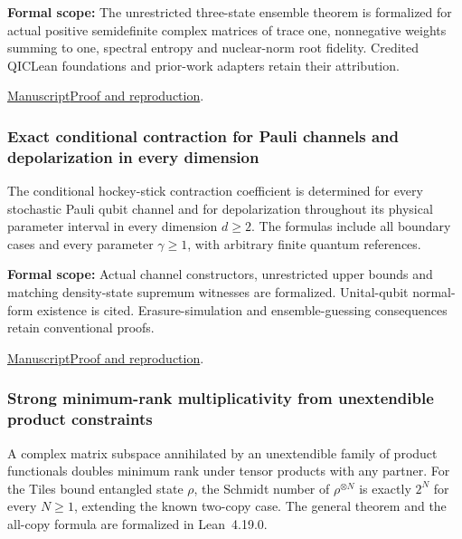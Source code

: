 \documentclass[11pt,a4paper]{article}
\begin{document}
\noindent\textbf{Formal scope:} The unrestricted three-state ensemble theorem is formalized for actual positive semidefinite complex matrices of trace one, nonnegative weights summing to one, spectral entropy and nuclear-norm root fidelity. Credited QICLean foundations and prior-work adapters retain their attribution.

\href{https://github.com/dvgyl/math-and-theory/blob/main/papers/physics/fidelity-three-state/manuscript.pdf}{Manuscript}\quad\href{https://github.com/dvgyl/math-and-theory/blob/main/papers/physics/fidelity-three-state/README.md}{Proof and reproduction}.

\subsubsection{Exact conditional contraction for Pauli channels and depolarization in every dimension}

The conditional hockey-stick contraction coefficient is determined for every stochastic Pauli qubit channel and for depolarization throughout its physical parameter interval in every dimension $d\ge2$. The formulas include all boundary cases and every parameter $\gamma\ge1$, with arbitrary finite quantum references.

\noindent\textbf{Formal scope:} Actual channel constructors, unrestricted upper bounds and matching density-state supremum witnesses are formalized. Unital-qubit normal-form existence is cited. Erasure-simulation and ensemble-guessing consequences retain conventional proofs.

\href{https://github.com/dvgyl/math-and-theory/blob/main/papers/physics/quantum-exact-contraction/quantum_exact_contraction.pdf}{Manuscript}\quad\href{https://github.com/dvgyl/math-and-theory/blob/main/papers/physics/quantum-exact-contraction/README.md}{Proof and reproduction}.

\subsubsection{Strong minimum-rank multiplicativity from unextendible product constraints}

A complex matrix subspace annihilated by an unextendible family of product functionals doubles minimum rank under tensor products with any partner. For the Tiles bound entangled state $\rho$, the Schmidt number of $\rho^{\otimes N}$ is exactly $2^N$ for every $N\ge1$, extending the known two-copy case. The general theorem and the all-copy formula are formalized in Lean~4.19.0.
\end{document}

